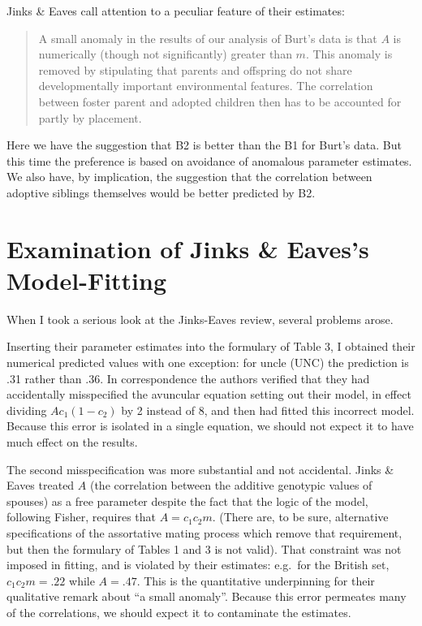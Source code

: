 ﻿\documentclass[12pt]{article}
\begin{document}
Jinks \& Eaves call attention to a peculiar feature of their estimates:

\begin{quote}
A small anomaly in the results of our analysis of Burt's data is that $A$ is numerically (though not significantly) greater than $m$. This anomaly is removed by stipulating that parents and offspring do not share developmentally important environmental features. The correlation between foster parent and adopted children then has to be accounted for partly by placement.
\end{quote}

Here we have the suggestion that B2 is better than the B1 for Burt's data. But this time the preference is based on avoidance of anomalous parameter estimates. We also have, by implication, the suggestion that the correlation between adoptive siblings themselves would be better predicted by B2.

\section{Examination of Jinks \& Eaves's Model-Fitting}

When I took a serious look at the Jinks-Eaves review, several problems arose.

Inserting their parameter estimates into the formulary of Table 3, I obtained their numerical predicted values with one exception: for uncle (UNC) the prediction is .31 rather than .36. In correspondence the authors verified that they had accidentally misspecified the avuncular equation setting out their model, in effect dividing $A c_1(1-c_2)$ by 2 instead of 8, and then had fitted this incorrect model. Because this error is isolated in a single equation, we should not expect it to have much effect on the results.

The second misspecification was more substantial and not accidental. Jinks \& Eaves treated $A$ (the correlation between the additive genotypic values of spouses) as a free parameter despite the fact that the logic of the model, following Fisher, requires that $A = c_1 c_2 m$. (There are, to be sure, alternative specifications of the assortative mating process which remove that requirement, but then the formulary of Tables 1 and 3 is not valid). That constraint was not imposed in fitting, and is violated by their estimates: e.g.\ for the British set, $c_1 c_2 m = .22$ while $A = .47$. This is the quantitative underpinning for their qualitative remark about ``a small anomaly''. Because this error permeates many of the correlations, we should expect it to contaminate the estimates.
\end{document}
